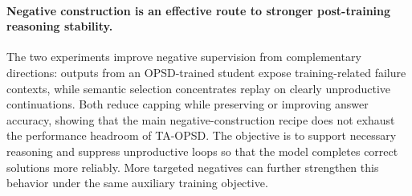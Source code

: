 \documentclass{article} %
\begin{document}
\paragraph{Negative construction is an effective route to stronger post-training reasoning stability.} The two experiments improve negative supervision from complementary directions: outputs from an OPSD-trained student expose training-related failure contexts, while semantic selection concentrates replay on clearly unproductive continuations. Both reduce capping while preserving or improving answer accuracy, showing that the main negative-construction recipe does not exhaust the performance headroom of TA-OPSD. The objective is to support necessary reasoning and suppress unproductive loops so that the model completes correct solutions more reliably. More targeted negatives can further strengthen this behavior under the same auxiliary training objective.
\end{document}
